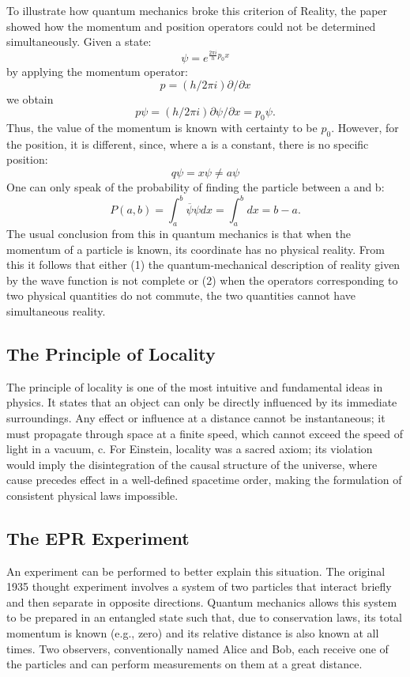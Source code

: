 To illustrate how quantum mechanics broke this criterion of Reality, the paper showed how the momentum and position operators could not be determined simultaneously.
Given a state:
$$ \psi = e^{\frac{2\pi i}{h}p_{0}x} $$
by applying the momentum operator:
$$ p = (h/2\pi i)\partial/\partial x $$
we obtain
$$ p\psi = (h/2\pi i)\partial\psi/\partial x = p_{0}\psi. $$
Thus, the value of the momentum is known with certainty to be $p_0$. However, for the position, it is different, since, where a is a constant, there is no specific position:
$$ q\psi = x\psi \ne a\psi $$
One can only speak of the probability of finding the particle between a and b:
$$ P(a,b) = \int_{a}^{b}\overline{\psi}\psi dx = \int_{a}^{b}dx = b-a. $$
The usual conclusion from this in quantum mechanics is that when the momentum of a particle is known, its coordinate has no physical reality. From this it follows that either
(1) the quantum-mechanical description of reality given by the wave function is not complete or (2) when the operators corresponding to two physical quantities do not commute, 
the two quantities cannot have simultaneous reality.

\subsection{The Principle of Locality}

The principle of locality is one of the most intuitive and fundamental ideas in physics. It states that an object can only be directly influenced by its immediate surroundings. 
Any effect or influence at a distance cannot be instantaneous; it must propagate through space at a finite speed, which cannot exceed the speed of light in a vacuum, c. For Einstein,
locality was a sacred axiom; its violation would imply the disintegration of the causal structure of the universe, where cause precedes effect in a well-defined spacetime order, making the
formulation of consistent physical laws impossible.

\subsection{The EPR Experiment}

An experiment can be performed to better explain this situation. The original 1935 thought experiment involves a system of two particles that interact briefly and then separate in opposite
directions. Quantum mechanics allows this system to be prepared in an entangled state such that, due to conservation laws, its total momentum is known (e.g., zero) and its relative distance
is also known at all times. Two observers, conventionally named Alice and Bob, each receive one of the particles and can perform measurements on them at a great distance.


